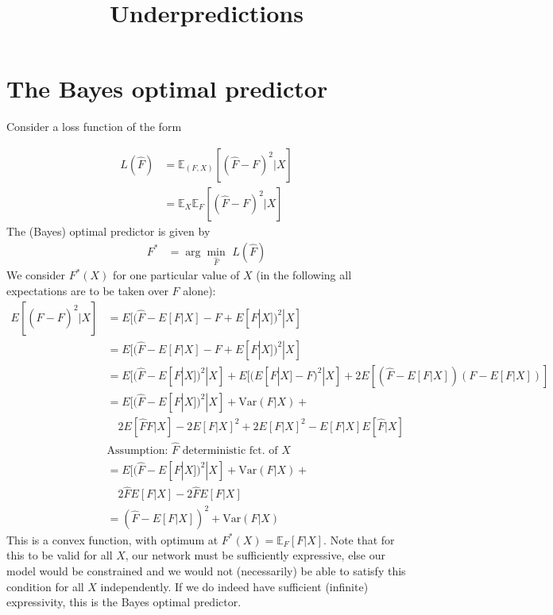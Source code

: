 \documentclass{article}
\title{Underpredictions}
\begin{document}
\section{The Bayes optimal predictor}

Consider a loss function of the form 

\begin{align*}
L(\hat F) &= \mathbb{E}_{(F,X)}\left[(\hat F - F)^2|X\right]
\\
&= \mathbb{E}_{X}\mathbb{E}_{F}\left[(\hat F - F)^2|X\right]
\end{align*}
The (Bayes) optimal predictor is given by 
\begin{align*}
    F^{*} &= \arg \underset{\hat F}{\min}\,\, L(\hat F)
\end{align*}
We consider $F^{*}(X)$ for one particular value of $X$ (in the following all expectations are to be taken over $F$ alone):
\begin{align*}
    E[(\hat F - F)^2|X] &=E[(\hat F - E[F|X]- F + E[F|X])^2|X] 
    \\
    &=E[(\hat F - E[F|X]- F + E[F|X])^2|X] 
    \\
    &=E[(\hat F - E[F|X])^2|X] + E[(E[F|X] - F)^2|X] + 2E[(\hat F - E[F|X])(F - E[F|X])] 
    \\
    &=E[(\hat F - E[F|X])^2|X] + \text{Var}(F|X) + \\ &\quad 2 E[\hat F F|X] - 2 E[F|X]^2 + 2 E[F|X]^2 - E[F|X]E[\hat F|X] 
    \\
    &\text{Assumption: $\hat F$ deterministic fct. of $X$}
    \\
    &=E[(\hat F - E[F|X])^2|X] + \text{Var}(F|X) + 
    \\
    &\quad 2 \hat F E[F|X] - 2 \hat F E[F|X] 
    \\
    & =(\hat F - E[F|X])^2 + \text{Var}(F|X) 
\end{align*}
This is a convex function, with optimum at $F^{*}(X)=\mathbb{E}_F [F|X] $. Note that for this to be valid for all $X$, our network must be sufficiently expressive, else our model would be constrained and we would not (necessarily) be able to satisfy this condition for all $X$ independently. If we do indeed have sufficient (infinite) expressivity, this is the {\color{blue} Bayes optimal predictor}.
\end{document}

